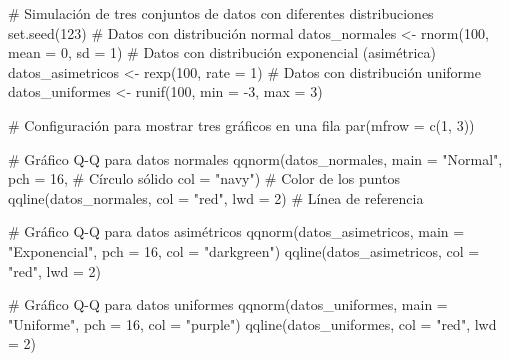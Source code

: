 \documentclass[
  spanish,
  a4paper,
  DIV=11,
  numbers=noendperiod,
  onepage,
  openany]{scrreprt}
\newenvironment{Shaded}{\begin{snugshade}}{\end{snugshade}}
\newcommand{\AttributeTok}[1]{\textcolor[rgb]{0.40,0.45,0.13}{#1}}
\newcommand{\CommentTok}[1]{\textcolor[rgb]{0.37,0.37,0.37}{#1}}
\newcommand{\DecValTok}[1]{\textcolor[rgb]{0.68,0.00,0.00}{#1}}
\newcommand{\FunctionTok}[1]{\textcolor[rgb]{0.28,0.35,0.67}{#1}}
\newcommand{\NormalTok}[1]{\textcolor[rgb]{0.00,0.23,0.31}{#1}}
\newcommand{\OtherTok}[1]{\textcolor[rgb]{0.00,0.23,0.31}{#1}}
\newcommand{\SpecialCharTok}[1]{\textcolor[rgb]{0.37,0.37,0.37}{#1}}
\newcommand{\StringTok}[1]{\textcolor[rgb]{0.13,0.47,0.30}{#1}}
\begin{document}
\begin{Shaded}
\begin{Highlighting}[]
\CommentTok{\# Simulación de tres conjuntos de datos con diferentes distribuciones}
\FunctionTok{set.seed}\NormalTok{(}\DecValTok{123}\NormalTok{)}
\CommentTok{\# Datos con distribución normal}
\NormalTok{datos\_normales }\OtherTok{\textless{}{-}} \FunctionTok{rnorm}\NormalTok{(}\DecValTok{100}\NormalTok{, }\AttributeTok{mean =} \DecValTok{0}\NormalTok{, }\AttributeTok{sd =} \DecValTok{1}\NormalTok{)   }
\CommentTok{\# Datos con distribución exponencial (asimétrica)}
\NormalTok{datos\_asimetricos }\OtherTok{\textless{}{-}} \FunctionTok{rexp}\NormalTok{(}\DecValTok{100}\NormalTok{, }\AttributeTok{rate =} \DecValTok{1}\NormalTok{)        }
\CommentTok{\# Datos con distribución uniforme}
\NormalTok{datos\_uniformes }\OtherTok{\textless{}{-}} \FunctionTok{runif}\NormalTok{(}\DecValTok{100}\NormalTok{, }\AttributeTok{min =} \SpecialCharTok{{-}}\DecValTok{3}\NormalTok{, }\AttributeTok{max =} \DecValTok{3}\NormalTok{)   }

\CommentTok{\# Configuración para mostrar tres gráficos en una fila}
\FunctionTok{par}\NormalTok{(}\AttributeTok{mfrow =} \FunctionTok{c}\NormalTok{(}\DecValTok{1}\NormalTok{, }\DecValTok{3}\NormalTok{))}

\CommentTok{\# Gráfico Q{-}Q para datos normales}
\FunctionTok{qqnorm}\NormalTok{(datos\_normales,}
       \AttributeTok{main =} \StringTok{"Normal"}\NormalTok{,}
       \AttributeTok{pch =} \DecValTok{16}\NormalTok{,                }\CommentTok{\# Círculo sólido}
       \AttributeTok{col =} \StringTok{"navy"}\NormalTok{)            }\CommentTok{\# Color de los puntos}
\FunctionTok{qqline}\NormalTok{(datos\_normales, }\AttributeTok{col =} \StringTok{"red"}\NormalTok{, }\AttributeTok{lwd =} \DecValTok{2}\NormalTok{)  }\CommentTok{\# Línea de referencia}

\CommentTok{\# Gráfico Q{-}Q para datos asimétricos}
\FunctionTok{qqnorm}\NormalTok{(datos\_asimetricos,}
       \AttributeTok{main =} \StringTok{"Exponencial"}\NormalTok{,}
       \AttributeTok{pch =} \DecValTok{16}\NormalTok{,}
       \AttributeTok{col =} \StringTok{"darkgreen"}\NormalTok{)}
\FunctionTok{qqline}\NormalTok{(datos\_asimetricos, }\AttributeTok{col =} \StringTok{"red"}\NormalTok{, }\AttributeTok{lwd =} \DecValTok{2}\NormalTok{)}

\CommentTok{\# Gráfico Q{-}Q para datos uniformes}
\FunctionTok{qqnorm}\NormalTok{(datos\_uniformes,}
       \AttributeTok{main =} \StringTok{"Uniforme"}\NormalTok{,}
       \AttributeTok{pch =} \DecValTok{16}\NormalTok{,}
       \AttributeTok{col =} \StringTok{"purple"}\NormalTok{)}
\FunctionTok{qqline}\NormalTok{(datos\_uniformes, }\AttributeTok{col =} \StringTok{"red"}\NormalTok{, }\AttributeTok{lwd =} \DecValTok{2}\NormalTok{)}
\end{Highlighting}
\end{Shaded}
\end{document}
